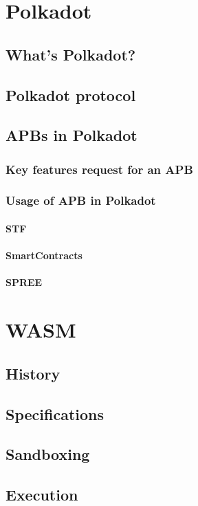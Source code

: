 \documentclass{article}
\begin{document}
\section{Polkadot}
\subsection{What's Polkadot?}
\subsection{Polkadot protocol}
\subsection{APBs in Polkadot}
\subsubsection{Key features request for an APB}
\subsubsection{Usage of APB in Polkadot}
\paragraph{STF}
\paragraph{SmartContracts}
\paragraph{SPREE}

\section{WASM}
\subsection{History}
\subsection{Specifications}
\subsection{Sandboxing}
\subsection{Execution}
\end{document}
